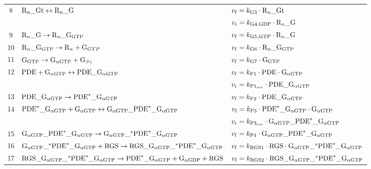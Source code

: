 \documentclass[a4paper, 12pt]{book}
\begin{document}
\begin{table}[H]
\begin{tabular}{c | l | l}
8 & ${\rm R}_n\_{\rm Gt} \leftrightarrow {\rm R}_n\_{\rm G}$ & $v_{\rm f} = k_{\rm G3} \cdot {\rm R}_n\_{\rm Gt}$\\
 & & $v_{\rm r} = k_{\rm G4,GDP} \cdot {\rm R}_n\_{\rm G} $\\
\hline
9 & ${\rm R}_n\_{\rm G} \rightarrow {\rm R}_n\_{\rm G}_{\rm GTP}$ & $v_{\rm f} = k_{\rm G5,GTP} \cdot {\rm R}_n\_{\rm G}$\\
\hline
10 & ${\rm R}_n\_{\rm G}_{\rm GTP} \rightarrow {\rm R}_n + {\rm G}_{GTP}$ & $v_{\rm f} = k_{\rm G6} \cdot {\rm R}_n\_{\rm G}_{\rm GTP}$\\
\hline
11 & ${\rm G}_{\rm GTP} \rightarrow {\rm G}_{\alpha{\rm GTP}} + {\rm G}_{\beta\gamma}$ & $v_{\rm f} =  k_{\rm G7} \cdot {\rm G}_{\rm GTP}$\\
\hline
12 & ${\rm PDE} + {\rm G}_{\alpha{\rm GTP}} \leftrightarrow {\rm PDE}\_{\rm G}_{\alpha{\rm GTP}}$ & $v_{\rm f} = k_{\rm P1} \cdot {\rm PDE} \cdot {\rm G}_{\alpha{\rm GTP}}$\\
 & & $v_{\rm r} = k_{\rm P1_{rev}} \cdot {\rm PDE}\_{\rm G}_{\alpha{\rm GTP}} $\\
\hline
13 & $ {\rm PDE}\_{\rm G}_{\alpha{\rm GTP}} \rightarrow {\rm PDE}^{*}\_{\rm G}_{\alpha{\rm GTP}} $ & $v_{\rm f} =  k_{\rm P2} \cdot {\rm PDE}\_{\rm G}_{\alpha{\rm GTP}}$\\
\hline
14 & $ {\rm PDE}^{*}\_{\rm G}_{\alpha{\rm GTP}} + {\rm G}_{\alpha{\rm GTP}} \leftrightarrow {\rm G}_{\alpha{\rm GTP}}\_{\rm PDE}^{*}\_{\rm G}_{\alpha{\rm GTP}}$ & $v_{\rm f} =  k_{\rm P3} \cdot {\rm PDE}^{*}\_{\rm G}_{\alpha{\rm GTP}} \cdot {\rm G}_{\alpha{\rm GTP}} $\\
 & & $v_{\rm r} = k_{\rm P3_{rev}} \cdot {\rm G}_{\alpha{\rm GTP}}\_{\rm PDE}^{*}\_{\rm G}_{\alpha{\rm GTP}} $\\
\hline
15 & $ {\rm G}_{\alpha{\rm GTP}}\_{\rm PDE}^{*}\_{\rm G}_{\alpha{\rm GTP}} \rightarrow {\rm G}_{\alpha{\rm GTP}}\_{\rm {}^{*} PDE}^{*}\_{\rm G}_{\alpha{\rm GTP}}$ & $v_{\rm f} =  k_{\rm P4} \cdot {\rm G}_{\alpha{\rm GTP}}\_{\rm PDE}^{*}\_{\rm G}_{\alpha{\rm GTP}} $\\
\hline
16 & ${\rm G}_{\alpha{\rm GTP}}\_{\rm {}^{*} PDE}^{*}\_{\rm G}_{\alpha{\rm GTP}} + {\rm RGS} \rightarrow {\rm RGS}\_{\rm G}_{\alpha{\rm GTP}}\_{\rm {}^{*} PDE}^{*}\_{\rm G}_{\alpha{\rm GTP}}$ & $v_{\rm f} =  k_{\rm RGS1} \cdot {\rm RGS} \cdot {\rm G}_{\alpha{\rm GTP}}\_{\rm {}^{*} PDE}^{*}\_{\rm G}_{\alpha{\rm GTP}} $\\
\hline
17 & ${\rm RGS}\_{\rm G}_{\alpha{\rm GTP}}\_{\rm {}^{*} PDE}^{*}\_{\rm G}_{\alpha{\rm GTP}} \rightarrow {\rm PDE}^{*}\_{\rm G}_{\alpha{\rm GTP}} + {\rm G}_{\alpha{\rm GDP}} + {\rm RGS} $ & $v_{\rm f} =  k_{\rm RGS2} \cdot {\rm RGS}\_{\rm G}_{\alpha{\rm GTP}}\_{\rm {}^{*} PDE}^{*}\_{\rm G}_{\alpha{\rm GTP}} $\\

\end{tabular}
\end{table}
\end{document}
